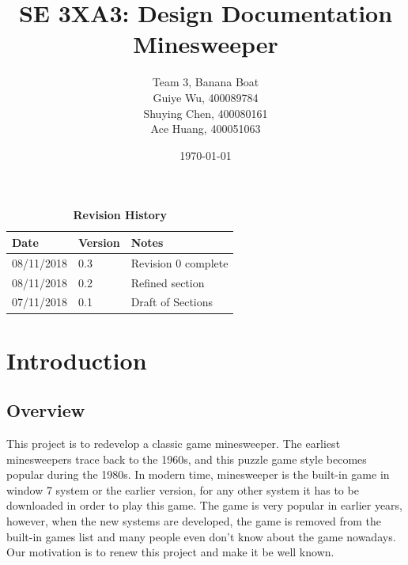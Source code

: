 \documentclass[12pt, titlepage]{article}
\title{SE 3XA3: Design Documentation\\Minesweeper}
\author{Team 3, Banana Boat
		\\ Guiye Wu, 400089784
		\\ Shuying Chen, 400080161
		\\ Ace Huang, 400051063}
\date{\today}
\begin{document}
\maketitle

\tableofcontents
\listoftables
\listoffigures

\newpage
\begin{table}[h!]
\caption{\bf Revision History}
\begin{tabularx}{\textwidth}{p{3cm}p{2cm}X}
\toprule {\bf Date} & {\bf Version} & {\bf Notes}\\
\midrule
08/11/2018& 0.3 & Revision 0 complete\\
08/11/2018& 0.2 & Refined section\\
07/11/2018 & 0.1 & Draft of Sections\\
\bottomrule
\end{tabularx}
\end{table}

\newpage


\section{Introduction}
\subsection{Overview}
This project is to redevelop a classic game minesweeper. The earliest minesweepers trace back to the 1960s, and this puzzle game style becomes popular during the 1980s. In modern time, minesweeper is the built-in game in window 7 system or the earlier version, for any other system it has to be downloaded in order to play this game. The game is very popular in earlier years, however, when the new systems are developed, the game is removed from the built-in games list and many people even don't know about the game nowadays. Our motivation is to renew this project and make it be well known. 
\end{document}
